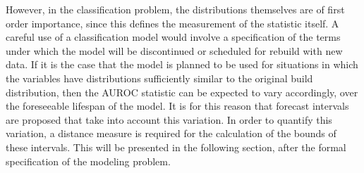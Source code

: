 However, in the classification problem, the distributions themselves are of first order importance, since this defines the measurement of the statistic itself.
A careful use of a classification model would involve a specification of the terms under which the model will be discontinued or scheduled for rebuild with new data.
If it is the case that the model is planned to be used for situations in which the variables have distributions sufficiently similar to the original build distribution, then the AUROC statistic can be expected to vary accordingly, over the foreseeable lifespan of the model.
It is for this reason that forecast intervals are proposed that take into account this variation.
%
%
In order to quantify this variation, a distance measure is required for the calculation of the bounds of these intervals.
%
%
This will be presented in the following section, after the formal specification of the modeling problem.



